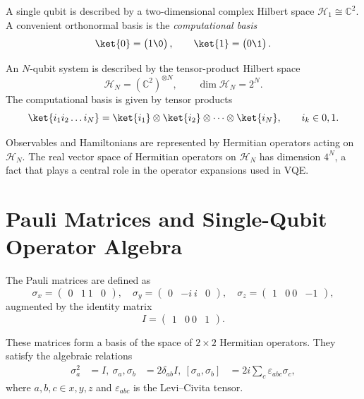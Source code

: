 \documentclass{book}
\begin{document}
A single qubit is described by a two-dimensional complex Hilbert space $\mathcal{H}_1 \cong \mathbb{C}^2$. A convenient orthonormal basis is the \emph{computational basis}
\begin{equation}
\ket{0} = \begin{pmatrix}1\0\end{pmatrix}, \qquad \ket{1} = \begin{pmatrix}0\1\end{pmatrix}.
\end{equation}

An $N$-qubit system is described by the tensor-product Hilbert space
\begin{equation}
\mathcal{H}_N = (\mathbb{C}^2)^{\otimes N}, \qquad \dim \mathcal{H}_N = 2^N.
\end{equation}
The computational basis is given by tensor products
\begin{equation}
\ket{i_1 i_2 \dots i_N} = \ket{i_1}\otimes\ket{i_2}\otimes\cdots\otimes\ket{i_N}, \qquad i_k \in {0,1}.
\end{equation}

Observables and Hamiltonians are represented by Hermitian operators acting on $\mathcal{H}_N$. The real vector space of Hermitian operators on $\mathcal{H}_N$ has dimension $4^N$, a fact that plays a central role in the operator expansions used in VQE.

\section{Pauli Matrices and Single-Qubit Operator Algebra}

The Pauli matrices are defined as
\begin{equation}
\sigma_x = \begin{pmatrix}0 & 1 \ 1 & 0\end{pmatrix}, \quad
\sigma_y = \begin{pmatrix}0 & -i \ i & 0\end{pmatrix}, \quad
\sigma_z = \begin{pmatrix}1 & 0 \ 0 & -1\end{pmatrix},
\end{equation}
augmented by the identity matrix
\begin{equation}
I = \begin{pmatrix}1 & 0 \ 0 & 1\end{pmatrix}.
\end{equation}

These matrices form a basis of the space of $2\times2$ Hermitian operators. They satisfy the algebraic relations
\begin{align}
\sigma_a^2 &= I, \
{\sigma_a, \sigma_b} &= 2\delta_{ab} I, \
[\sigma_a, \sigma_b] &= 2i \sum_{c} \varepsilon_{abc} \sigma_c,
\end{align}
where $a,b,c \in {x,y,z}$ and $\varepsilon_{abc}$ is the Levi--Civita tensor.
\end{document}
